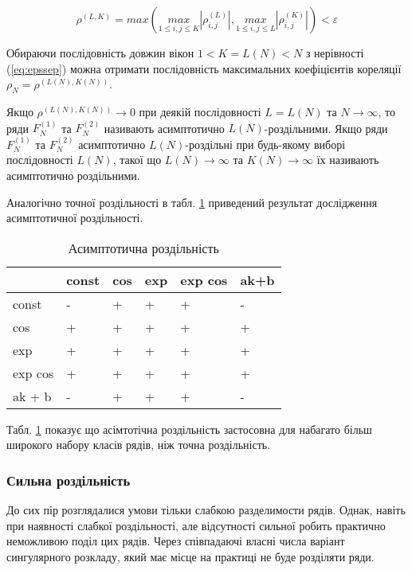 \begin{equation}\label{eq:epssep}
\rho^{(L,K)} = max(\underset{1 \le i,j \le K}{max}|\rho_{i,j}^{(L)}|, \underset{1 \le i,j \le L}{max}|\rho_{i,j}^{(K)}|) < \varepsilon
\end{equation}

Обираючи послідовність довжин вікон $1 < K = L(N) < N$ з нерівності (\ref{eq:epssep}) можна отримати послідовність максимальних коефіцієнтів кореляції $\rho_{N} = \rho^{(L(N),K(N))}$.

Якщо $\rho^{(L(N),K(N))} \longrightarrow 0$ при деякій послідовності $L=L(N)$ та $N \longrightarrow \infty$, то ряди $F_{N}^{(1)}$ та $F_{N}^{(2)}$ називають асимптотично $L(N)$-роздільними. Якщо ряди $F_{N}^{(1)}$ та $F_{N}^{(2)}$ асимптотично $L(N)$-роздільні при будь-якому виборі послідовності $L(N)$, такої що $L(N) \longrightarrow \infty$ та $K(N) \longrightarrow \infty$ їх називають асимптотично роздільними.

Аналогічно точної роздільності в табл. \ref{tab:assep} приведений результат дослідження асимптотичної роздільності.

\begin{table}[h]
	\captionstyle{ \raggedright}
	\caption{Асимптотична роздільність}\label{tab:assep}
	\centering
	\begin{tabular}{| p{} | p{} | p{} | p{} | p{} | p{} |}
	\hline
	 & const & cos & exp & exp cos & ak+b \\
	\hline
	const & - & + & + & + & - \\
	\hline
	cos & + & + & + & + & + \\
	\hline
	exp & + & + & + & + & + \\
	\hline
	exp cos & + & + & + & + & + \\
	\hline
	ak + b & - & + & + & + & - \\
	\hline
	\end{tabular}
\end{table}

Табл. \ref{tab:assep} показує що асімтотічна роздільність застосовна для набагато більш широкого набору класів рядів, ніж точна роздільність.

\subsubsection{Сильна роздільність}

До сих пір розглядалися умови тільки слабкою разделимости рядів. Однак, навіть при наявності слабкої роздільності, але відсутності сильної робить практично неможливою поділ цих рядів. Через співпадаючі власні числа варіант сингулярного розкладу, який має місце на практиці не буде розділяти ряди.


